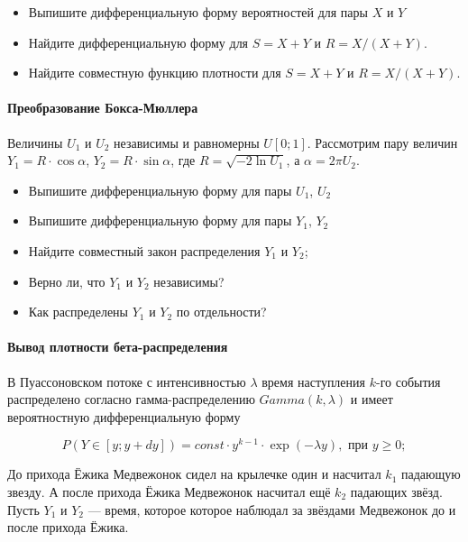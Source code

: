 \documentclass[11pt,russian,]{article}
\providecommand{\tightlist}{%
  \setlength{\itemsep}{0pt}\setlength{\parskip}{0pt}}
\let\oldparagraph\paragraph
\renewcommand{\paragraph}[1]{\oldparagraph{#1}\mbox{}}
\begin{document}
\begin{itemize}
\tightlist
\item
  Выпишите дифференциальную форму вероятностей для пары \(X\) и \(Y\)
\item
  Найдите дифференциальную форму для \(S = X+Y\) и \(R = X/(X + Y)\).
\item
  Найдите совместную функцию плотности для \(S = X+Y\) и
  \(R = X/(X + Y)\).
\end{itemize}

\paragraph{Преобразование Бокса-Мюллера}\label{--}

Величины \(U_1\) и \(U_2\) независимы и равномерны \(U[0;1]\).
Рассмотрим пару величин \(Y_1 = R\cdot \cos \alpha\),
\(Y_2 = R\cdot \sin \alpha\), где \(R=\sqrt{-2\ln U_1}\), а
\(\alpha = 2\pi U_2\).

\begin{itemize}
\tightlist
\item
  Выпишите дифференциальную форму для пары \(U_1\), \(U_2\)
\item
  Выпишите дифференциальную форму для пары \(Y_1\), \(Y_2\)
\item
  Найдите совместный закон распределения \(Y_1\) и \(Y_2\);
\item
  Верно ли, что \(Y_1\) и \(Y_2\) независимы?
\item
  Как распределены \(Y_1\) и \(Y_2\) по отдельности?
\end{itemize}

\paragraph{Вывод плотности бета-распределения}\label{---}

В Пуассоновском потоке с интенсивностью \(\lambda\) время наступления
\(k\)-го события распределено согласно гамма-распределению
\(Gamma(k, \lambda)\) и имеет вероятностную дифференциальную форму

\[
P(Y \in [y; y+dy]) = const \cdot y^{k-1} \cdot \exp(-\lambda y), \text{ при } y\geq 0;
\]

До прихода Ёжика Медвежонок сидел на крылечке один и насчитал \(k_1\)
падающую звезду. А после прихода Ёжика Медвежонок насчитал ещё \(k_2\)
падающих звёзд. Пусть \(Y_1\) и \(Y_2\) --- время, которое которое
наблюдал за звёздами Медвежонок до и после прихода Ёжика.
\end{document}
